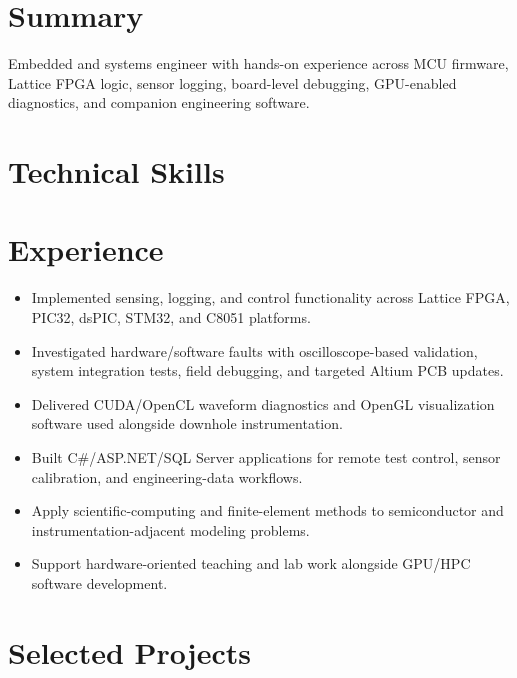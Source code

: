 \section{Summary}
Embedded and systems engineer with hands-on experience across MCU firmware, Lattice FPGA logic, sensor logging, board-level debugging, GPU-enabled diagnostics, and companion engineering software.
\section{Technical Skills}
\section{Experience}
\begin{itemize}
\item Implemented sensing, logging, and control functionality across Lattice FPGA, PIC32, dsPIC, STM32, and C8051 platforms.
\item Investigated hardware/software faults with oscilloscope-based validation, system integration tests, field debugging, and targeted Altium PCB updates.
\item Delivered CUDA/OpenCL waveform diagnostics and OpenGL visualization software used alongside downhole instrumentation.
\item Built C\#/ASP.NET/SQL Server applications for remote test control, sensor calibration, and engineering-data workflows.
\end{itemize}
\begin{itemize}
\item Apply scientific-computing and finite-element methods to semiconductor and instrumentation-adjacent modeling problems.
\item Support hardware-oriented teaching and lab work alongside GPU/HPC software development.
\end{itemize}
\section{Selected Projects}
